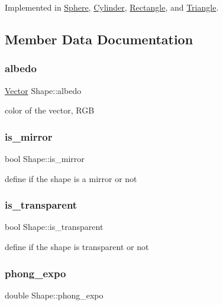Implemented in \hyperlink{classSphere_acbd56a4021638361d354e21d68f98e62}{Sphere}, \hyperlink{classCylinder_a0f3c6cca45e3efa5250dc45ebcff81e5}{Cylinder}, \hyperlink{classRectangle_a423b89ddb4be31c3ff22a86dcf076b08}{Rectangle}, and \hyperlink{classTriangle_a3290db0f1a807905ff0293b209e32dbf}{Triangle}.



\subsection{Member Data Documentation}
\mbox{\label{classShape_afc030a51120dade6f5c5b90c2d60087e}} 
\subsubsection{\texorpdfstring{albedo}{albedo}}
{\footnotesize\ttfamily \hyperlink{classVector}{Vector} Shape\+::albedo}

color of the vector, R\+GB \mbox{\label{classShape_a0ead7657fa5e4c7862fe1cedd670a9e5}} 
\subsubsection{\texorpdfstring{is\+\_\+mirror}{is\_mirror}}
{\footnotesize\ttfamily bool Shape\+::is\+\_\+mirror}

define if the shape is a mirror or not \mbox{\label{classShape_ab8da3fc4606e66dea941ec23d25f53ef}} 
\subsubsection{\texorpdfstring{is\+\_\+transparent}{is\_transparent}}
{\footnotesize\ttfamily bool Shape\+::is\+\_\+transparent}

define if the shape is transparent or not \mbox{\label{classShape_a2556fca106f9503e6dfb4da703c28f7f}} 
\subsubsection{\texorpdfstring{phong\+\_\+expo}{phong\_expo}}
{\footnotesize\ttfamily double Shape\+::phong\+\_\+expo}

